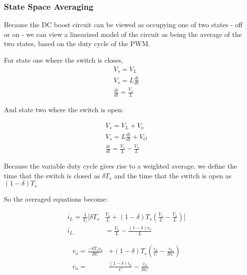 \subsubsection{State Space Averaging}

Because the DC boost circuit can be viewed as occupying one of two states - off or on - we can view a linearized model of the circuit as being the average of the two states, based on the duty cycle of the PWM. 

For state one where the switch is closes, 
\begin{equation}
\begin{split}
V_s = V_L \\
V_s = L\frac{di}{dt} \\
\frac{di}{dt} = \frac{V_s}{L}
\end{split}
\end{equation}

And state two where the switch is open:

\begin{equation}
\begin{split}
V_s = V_L + V_o\\
V_s = L\frac{di}{dt} + V_O \\
\frac{di}{dt} = \frac{V_s}{L} - \frac{V_o}{L}
\end{split}
\end{equation}

Because the variable duty cycle gives rise to a weighted average, we define the time that the switch is closed as $\delta T_s$ and the time that the switch is open as $(1-\delta)T_s$

So the averaged equations become: 

\begin{equation}
\begin{split}
\dot{i_L} = \frac{1}{T_s}[\delta T_s & \frac{V_s}{L} + (1-\delta)T_s(\frac{V_s}{L} - \frac{V_o}{L})] \\
\dot{i_L} &= \frac{V_s}{L} - \frac{(1-\delta)v_o}{L}
\end{split}
\end{equation}

\begin{equation}
\begin{split}
\dot{v_o} = \frac{-\delta T_s v_o}{RC}& +  (1-\delta)T_s(\frac{i_L}{C} - \frac{v_o}{RC})\\
\dot{v_o} = &\frac{(1-\delta)i_L}{C} - \frac{v_o}{RC}
\end{split}
\end{equation}

